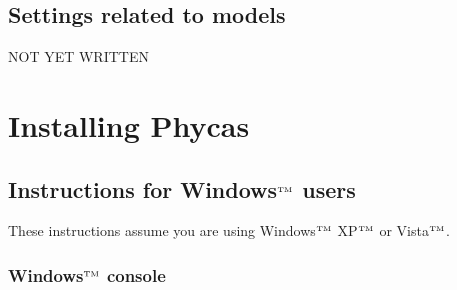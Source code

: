 \documentclass[10pt]{article}
\newcommand{\trademark}[1]{#1${}^{\mbox{\tiny TM}}$}
\begin{document}
\subsection{Settings related to models}\label{subsec:modelsettings}
NOT YET WRITTEN
%

\section{Installing Phycas}\label{sec:install}
\subsection{Instructions for \trademark{Windows} users} 

These instructions assume you are using \trademark{Windows} \trademark{XP} or \trademark{Vista}.

\subsubsection{\trademark{Windows} console}
\end{document}
